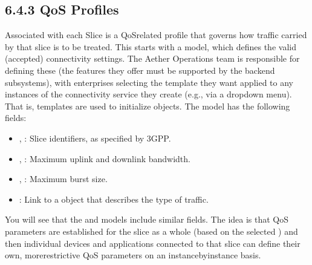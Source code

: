 \documentclass[a4paper,11pt,english]{sphinxmanual}
\begin{document}
\subsection{6.4.3 QoS Profiles}
\label{\detokenize{cloud:qos-profiles}}
\sphinxAtStartPar
Associated with each Slice is a QoS\sphinxhyphen{}related profile that governs how
traffic carried by that slice is to be treated. This starts with a
 model, which defines the valid (accepted) connectivity
settings. The Aether Operations team is responsible for defining these (the
features they offer must be supported by the backend subsystems), with
enterprises selecting the template they want applied to any instances
of the connectivity service they create (e.g., via a drop\sphinxhyphen{}down
menu). That is, templates are used to initialize  objects. The
 model has the following fields:
\begin{itemize}
\item {} 
\sphinxAtStartPar
{}, : Slice identifiers, as specified by 3GPP.

\item {} 
\sphinxAtStartPar
{}, : Maximum uplink and downlink bandwidth.

\item {} 
\sphinxAtStartPar
{}, : Maximum burst size.

\item {} 
\sphinxAtStartPar
{}: Link to a  object that describes the
type of traffic.

\end{itemize}

\sphinxAtStartPar
You will see that the  and  models include
similar fields. The idea is that QoS parameters are established for
the slice as a whole (based on the selected ) and then
individual devices and applications connected to that slice can define
their own, more\sphinxhyphen{}restrictive QoS parameters on an instance\sphinxhyphen{}by\sphinxhyphen{}instance
basis.
\end{document}
